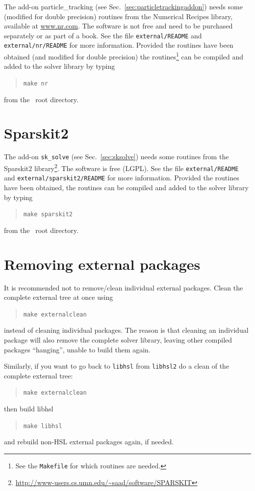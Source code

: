 The add-on particle\_tracking (see Sec.~\ref{sec:particletrackingaddon}) needs some (modified for double precision) routines from the Numerical Recipes library\cite{Press92,Press96}, available
at \href{http://www.nr.com}{www.nr.com}.
The software is not free and need to be purchased separately or as part of a book.
See the file \texttt{external/README} and \texttt{external/nr/README} for more information. Provided the routines have been obtained (and modified for double precision) the routines\footnote{See the \texttt{Makefile} for which routines are needed.} can be compiled and added to the solver library by
typing
\begin{quote}
   \texttt{make nr}
\end{quote}
from the \tfem\ root directory.

\section{Sparskit2}
\label{sec:sparskit2}

The add-on \texttt{sk\_solve} (see Sec.~\ref{sec:sksolve}) needs some routines from the Sparskit2 
library\footnote{\href{http://www-users.cs.umn.edu/~saad/software/SPARSKIT}{http://www-users.cs.umn.edu/\textasciitilde{}saad/software/SPARSKIT}}. 
The software is free (LGPL). See the file \texttt{external/README} and \texttt{external/sparskit2/README} for more information. Provided the routines have been obtained, the routines can be compiled and added to the solver library by
typing
\begin{quote}
   \texttt{make sparskit2}
\end{quote}
from the \tfem\ root directory.

\section{Removing external packages}
\label{sec:external_removing}

It is recommended not to remove/clean individual external packages.
Clean the complete external tree at once using
\begin{quote}
   \texttt{make externalclean}
\end{quote}
instead of cleaning individual packages. The reason is that cleaning an
    individual package will also remove the complete solver library, leaving
    other compiled packages ``hanging'', unable to build them again. 

Similarly, if you want to go back to \texttt{libhsl} from \texttt{libhsl2} do a
clean of the complete external tree:
\begin{quote}
      \texttt{make externalclean}
\end{quote}
    then build libhsl
\begin{quote}
      \texttt{make libhsl}
\end{quote}
    and rebuild non-HSL external packages again, if needed.






